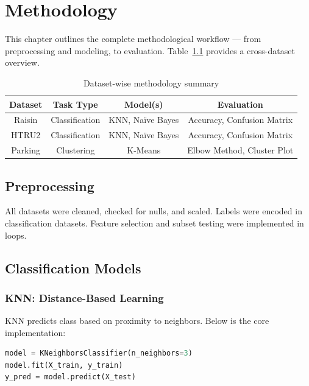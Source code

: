\chapter{Methodology}
\label{ch:methods}

This chapter outlines the complete methodological workflow — from preprocessing and modeling, to evaluation. Table~\ref{tab:method_summary} provides a cross-dataset overview.

\begin{table}[H]
    \centering
    \caption{Dataset-wise methodology summary}
    \label{tab:method_summary}
    \begin{tabular}{|c|c|c|c|}
        \hline
        \textbf{Dataset} & \textbf{Task Type} & \textbf{Model(s)} & \textbf{Evaluation} \\
        \hline
        Raisin & Classification & KNN, Naïve Bayes & Accuracy, Confusion Matrix \\
        HTRU2 & Classification & KNN, Naïve Bayes & Accuracy, Confusion Matrix \\
        Parking & Clustering & K-Means & Elbow Method, Cluster Plot \\
        \hline
    \end{tabular}
\end{table}

\section{Preprocessing}

All datasets were cleaned, checked for nulls, and scaled. Labels were encoded in classification datasets. Feature selection and subset testing were implemented in loops.

\section{Classification Models}

\subsection{KNN: Distance-Based Learning}
\label{sec:method_knn}

KNN predicts class based on proximity to neighbors. Below is the core implementation:

\begin{lstlisting}[language=Python, caption={KNN implementation snippet}, label=list:knn_code]
model = KNeighborsClassifier(n_neighbors=3)
model.fit(X_train, y_train)
y_pred = model.predict(X_test)
\end{lstlisting}

